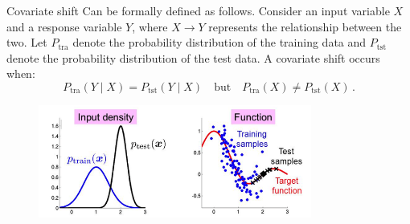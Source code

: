 \begin{frame}{Covariate shift}
Can be formally defined as follows. Consider an input variable \( X \) and a response variable \( Y \), where \( X \to Y \) represents the relationship between the two. Let \( P_{\text{tra}} \) denote the probability distribution of the training data and \( P_{\text{tst}} \) denote the probability distribution of the test data. A covariate shift occurs when:  
\[
P_{\text{tra}}(Y \mid X) = P_{\text{tst}}(Y \mid X) \quad \text{but} \quad P_{\text{tra}}(X) \neq P_{\text{tst}}(X)\,.
\]
\begin{figure}[H]
	\centering
	\includegraphics[width=0.8\textwidth]{../assets/immagine.png} 
    \label{fig:covariate-shift}
\end{figure}
\end{frame}

